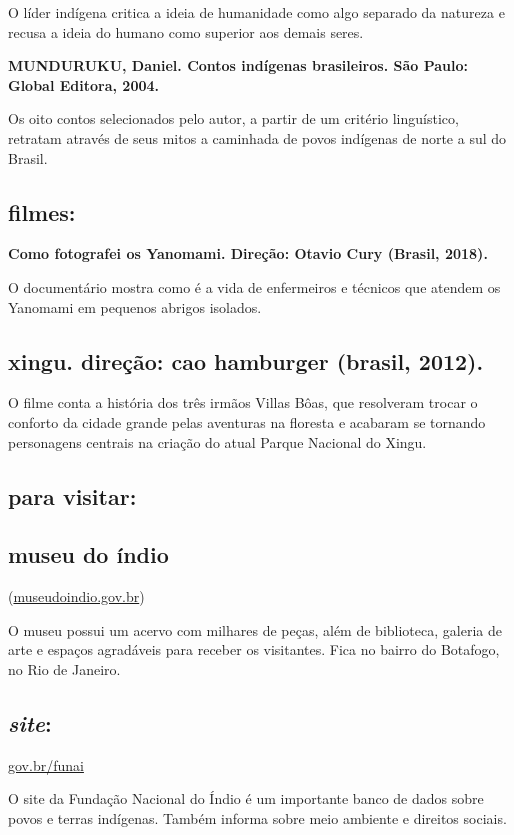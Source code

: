 \documentclass[12pt]{extarticle}
\begin{document}
O líder indígena critica a ideia de humanidade como algo separado da
natureza e recusa a ideia do humano como superior aos demais seres.

\textbf{MUNDURUKU, Daniel. Contos indígenas brasileiros. São Paulo:
Global Editora, 2004.}

Os oito contos selecionados pelo autor, a partir de um critério
linguístico, retratam através de seus mitos a caminhada de povos
indígenas de norte a sul do Brasil.

\subsection{filmes: }

\textbf{Como fotografei os Yanomami. Direção: Otavio Cury (Brasil,
2018).}

O documentário mostra como é a vida de enfermeiros e técnicos que
atendem os Yanomami em pequenos abrigos isolados.

\subsection{xingu. direção: cao hamburger (brasil, 2012).}

O filme conta a história dos três irmãos Villas Bôas, que resolveram
trocar o conforto da cidade grande pelas aventuras na floresta e
acabaram se tornando personagens centrais na criação do atual Parque
Nacional do Xingu.

\subsection{para visitar: }\subsection{museu do índio}
(\href{http://www.museudoindio.gov.br/}{{museudoindio.gov.br}})

O museu possui um acervo com milhares de peças, além de biblioteca,
galeria de arte e espaços agradáveis para receber os visitantes. Fica no
bairro do Botafogo, no Rio de Janeiro.

\subsection{\emph{site}:}

\href{http://www.gov.br/funai}{{gov.br/funai}}

O site da Fundação Nacional do Índio é um importante banco de dados
sobre povos e terras indígenas. Também informa sobre meio ambiente e
direitos sociais.
\end{document}
